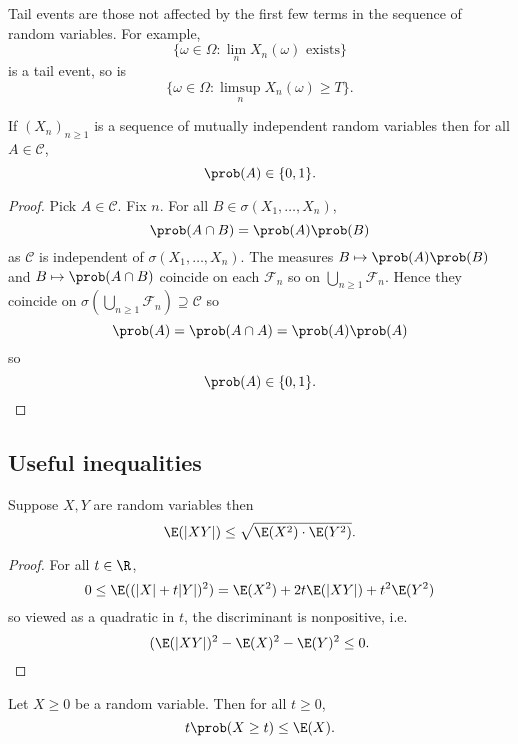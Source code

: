 \documentclass[a4paper]{article}
\renewcommand{\P}{\prob} %
\begin{document}
\begin{eg}
  Tail events are those not affected by the first few terms in the sequence of random variables. For example,
  \[
    \{\omega \in \Omega: \lim_n X_n(\omega) \text{ exists}\}
  \]
  is a tail event, so is
  \[
    \{\omega \in \Omega: \limsup_n X_n(\omega) \geq T\}.
  \]
\end{eg}

\begin{theorem}
  If \((X_n)_{n \geq 1}\) is a sequence of mutually independent random variables then for all \(A \in \mathcal C\),
  \[
    \P(A) \in \{0, 1\}.
  \]
\end{theorem}

\begin{proof}
  Pick \(A \in \mathcal C\). Fix \(n\). For all \(B \in \sigma(X_1, \dots, X_n)\),
  \[
    \P(A \cap B) = \P(A) \P(B)
  \]
  as \(\mathcal C\) is independent of \(\sigma(X_1, \dots, X_n)\). The measures \(B \mapsto \P(A) \P(B)\) and \(B \mapsto \P(A \cap B)\) coincide on each \(\mathcal F_n\) so on \(\bigcup_{n \geq 1} \mathcal F_n\). Hence they coincide on \(\sigma(\bigcup_{n \geq 1} \mathcal F_n) \supseteq \mathcal C\) so
  \[
    \P(A) = \P(A \cap A) = \P(A) \P(A)
  \]
  so
  \[
    \P(A) \in \{0, 1\}.
  \]
\end{proof}

\subsection{Useful inequalities}

\begin{proposition}
  Suppose \(X, Y\) are random variables then
  \[
    \E(|XY|) \leq \sqrt{\E(X^2) \cdot \E(Y^2)}.
  \]
\end{proposition}

\begin{proof}
  For all \(t \in \R\),
  \[
    0 \leq \E((|X| + t|Y|)^2) = \E(X^2) + 2t \E(|XY|) + t^2\E(Y^2)
  \]
  so viewed as a quadratic in \(t\), the discriminant is nonpositive, i.e.
  \[
    (\E(|XY|)^2 - \E(X)^2 - \E(Y)^2 \leq 0.
  \]
\end{proof}

\begin{proposition}[Markov]
  Let \(X \geq 0\) be a random variable. Then for all \(t \geq 0\),
  \[
    t \P(X \geq t) \leq \E(X).
  \]
\end{proposition}
\end{document}
